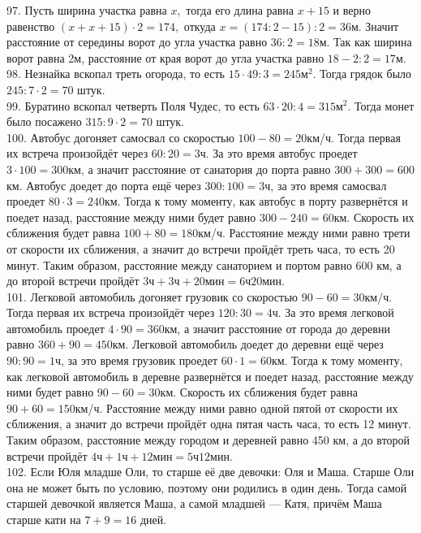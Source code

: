 97. Пусть ширина участка равна $x,$ тогда его длина равна $x+15$ и верно равенство $(x+x+15)\cdot2=174,$ откуда $x=(174:2-15):2=36\text{м}.$ Значит расстояние от середины ворот до угла участка равно $36:2=18\text{м}.$ Так как ширина ворот равна 2м, расстояние от края ворот до угла участка равно $18-2:2=17\text{м}.$\\
98. Незнайка вскопал треть огорода, то есть $15\cdot49:3=245\text{м}^2.$ Тогда грядок было $245:7\cdot2=70$ штук.\\
99. Буратино вскопал четверть Поля Чудес, то есть $63\cdot20:4=315\text{м}^2.$ Тогда монет было посажено $315:9\cdot2=70$ штук.\\
100. Автобус догоняет самосвал со скоростью $100-80=20$км/ч. Тогда первая их встреча произойдёт через $60:20=3$ч. За это время автобус проедет $3\cdot100=300$км, а значит расстояние от санатория до порта равно $300+300=600$км. Автобус доедет до порта ещё через $300:100=3$ч, за это время самосвал проедет $80\cdot3=240$км. Тогда к тому моменту, как автобус в порту развернётся и поедет назад, расстояние между ними будет равно $300-240=60$км. Скорость их сближения будет равна $100+80=180$км/ч. Расстояние между ними равно трети от скорости их сближения, а значит до встречи пройдёт треть часа, то есть 20 минут. Таким образом, расстояние между санаторием и портом равно 600 км, а до второй встречи пройдёт $3\text{ч}+3\text{ч}+20\text{мин}=6\text{ч}20\text{мин}.$\\
101. Легковой автомобиль догоняет грузовик со скоростью $90-60=30$км/ч. Тогда первая их встреча произойдёт через $120:30=4$ч. За это время легковой автомобиль проедет $4\cdot90=360$км, а значит расстояние от города до деревни равно $360+90=450$км. Легковой автомобиль доедет до деревни ещё через $90:90=1$ч, за это время грузовик проедет $60\cdot1=60$км. Тогда к тому моменту, как легковой автомобиль в деревне развернётся и поедет назад, расстояние между ними будет равно $90-60=30$км. Скорость их сближения будет равна $90+60=150$км/ч. Расстояние между ними равно одной пятой от скорости их сближения, а значит до встречи пройдёт одна пятая часть часа, то есть 12 минут. Таким образом, расстояние между городом и деревней равно 450 км, а до второй встречи пройдёт $4\text{ч}+1\text{ч}+12\text{мин}=5\text{ч}12\text{мин}.$\\
102. Если Юля младше Оли, то старше её две девочки: Оля и Маша. Старше Оли она не может быть по условию, поэтому они родились в один день. Тогда самой старшей девочкой является Маша, а самой младшей --- Катя, причём Маша старше кати на $7+9=16$ дней.\\
